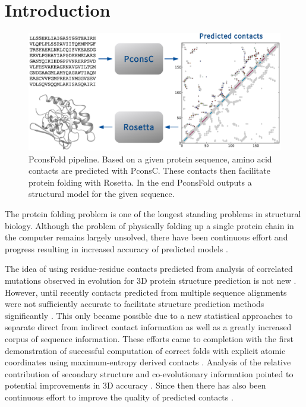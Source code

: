 \documentclass{bioinfo}
\begin{document}
\section{Introduction}
\begin{figure}[!tpb]%
\centerline{\includegraphics[scale=0.35]{figures/pipeline.eps}}
\caption{PconsFold pipeline. Based on a given protein sequence,
 amino acid contacts are predicted with PconsC. These contacts then
 facilitate protein folding with Rosetta. In the end PconsFold
 outputs a structural model for the given
 sequence.}\label{fig:pipeline} 
\end{figure}

The protein folding problem is one of the
longest standing problems in structural biology. Although the problem
of physically folding up a single protein chain in the computer
remains largely unsolved, there have been continuous effort and
progress resulting in increased accuracy of predicted models
\cite[]{kryshtafovych_CASP10_2013}.

The idea of using residue-residue contacts predicted from analysis of
correlated mutations observed in evolution for 3D protein structure
prediction is not new
\cite[]{gobel_correlated_1994,Neher8278414,Hatrick16649265,Shindyalov_can_1994,Vendruscolo9377713}.
However, until recently contacts predicted from multiple sequence
alignments were not sufficiently accurate to facilitate structure
prediction methods significantly \cite[]{marks_protein_2012}.  This
only became possible due to a new statistical approaches to separate
direct from indirect contact information \cite[]{Lapedes1999,
Lapedes2002, Weigt19116270,burger_disentangling_2010,
morcos_direct-coupling_2011, marks_protein_2011} as well as a greatly
increased corpus of sequence information. These efforts came to
completion with the first demonstration of successful computation of
correct folds with explicit atomic coordinates using maximum-entropy
derived contacts \cite[]{marks_protein_2011}. Analysis of the relative
contribution of secondary structure and co-evolutionary information
pointed to potential improvements in 3D accuracy
\cite[]{Sulkowska22691493}. Since then there has also been continuous
effort to improve the quality of predicted contacts
\cite[]{jones_psicov:_2012, ekeberg_improved_2013,
skwark_PconsC:_2013}.
\end{document}

